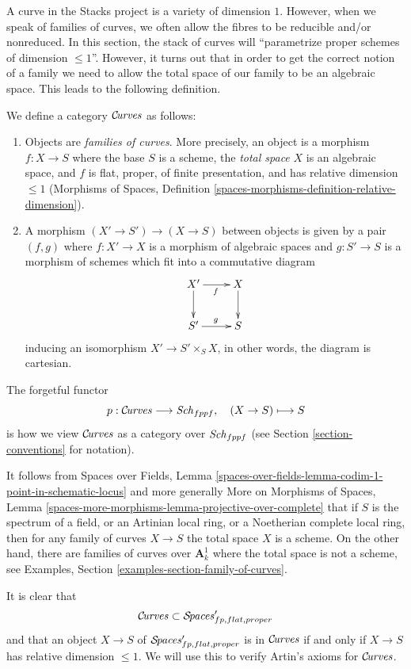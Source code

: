 \medskip\noindent
A curve in the Stacks project is a variety of dimension $1$.
However, when we speak of families of curves, we often allow
the fibres to be reducible and/or nonreduced. In this section,
the stack of curves will ``parametrize proper schemes of
dimension $\leq 1$''. However, it turns out that in order
to get the correct notion of a family we need to allow the
total space of our family to be an algebraic space.
This leads to the following definition.

\begin{situation}
\label{situation-curves}
We define a category $\mathcal{C}\!\mathit{urves}$ as follows:
\begin{enumerate}
\item Objects are {\it families of curves}. More precisely, an
object is a morphism $f : X \to S$ where the base $S$ is a scheme,
the {\it total space} $X$ is an algebraic space, and
$f$ is flat, proper, of finite presentation,
and has relative dimension $\leq 1$ (Morphisms of Spaces, Definition
\ref{spaces-morphisms-definition-relative-dimension}).
\item A morphism $(X' \to S') \to (X \to S)$ between objects
is given by a pair $(f, g)$ where $f : X' \to X$ is a morphism
of algebraic spaces and $g : S' \to S$ is a morphism of schemes
which fit into a commutative diagram
$$
\xymatrix{
X' \ar[d] \ar[r]_f & X \ar[d] \\
S' \ar[r]^g & S
}
$$
inducing an isomorphism $X' \to S' \times_S X$, in other words, the
diagram is cartesian.
\end{enumerate}
The forgetful functor
$$
p : \mathcal{C}\!\mathit{urves} \longrightarrow \mathit{Sch}_{fppf},\quad
(X \to S) \longmapsto S
$$
is how we view $\mathcal{C}\!\mathit{urves}$ as a category over $\mathit{Sch}_{fppf}$
(see Section \ref{section-conventions} for notation).
\end{situation}

\noindent
It follows from Spaces over Fields, Lemma
\ref{spaces-over-fields-lemma-codim-1-point-in-schematic-locus}
and more generally
More on Morphisms of Spaces, Lemma
\ref{spaces-more-morphisms-lemma-projective-over-complete}
that if $S$ is the spectrum of a field, or an Artinian local ring,
or a Noetherian complete local ring, then for any family of curves
$X \to S$ the total space $X$ is a scheme.
On the other hand, there are families of curves
over $\mathbf{A}^1_k$ where the total space is not a scheme, see
Examples, Section \ref{examples-section-family-of-curves}.

\medskip\noindent
It is clear that
\begin{equation}
\label{equation-curves-over-proper-spaces}
\mathcal{C}\!\mathit{urves} \subset \mathcal{S}\!\mathit{paces}'_{fp, flat, proper}
\end{equation}
and that an object $X \to S$ of $\mathcal{S}\!\mathit{paces}'_{fp, flat, proper}$
is in $\mathcal{C}\!\mathit{urves}$ if and only if $X \to S$ has relative
dimension $\leq 1$. We will use this to verify Artin's axioms
for $\mathcal{C}\!\mathit{urves}$.

